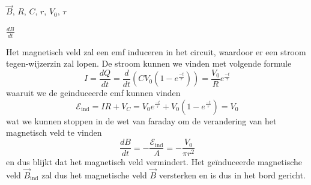     \begin{description}[labelwidth=1.5cm, leftmargin=!]
        \item[Geg. :] $\vec{B}$, $R$, $C$, $r$, $V_0$, $\tau$
        \item[Gevr. :] $\frac{dB}{dt}$
        \item[Opl. :]
            Het magnetisch veld zal een emf induceren in het circuit, waardoor er een stroom tegen-wijzerzin zal lopen. De stroom kunnen we vinden met volgende formule 
            \begin{equation*}
                I = \frac{dQ}{dt} = \frac{d}{dt} \left(CV_0(1-e^{\frac{-t}{\tau}})\right) = \frac{V_0}{R}e^{\frac{-t}{\tau}}
            \end{equation*}
            waaruit we de geinduceerde emf kunnen vinden
            \begin{equation*}
                \mathcal{E}_{\text{ind}} = IR + V_C = V_0e^{\frac{-t}{\tau}} + V_0\left( 1 - e^{\frac{-t}{\tau}}\right) = V_0
            \end{equation*}
            wat we kunnen stoppen in de wet van faraday om de verandering van het magnetisch veld te vinden
            \begin{equation*}
                \frac{dB}{dt} = - \frac{\mathcal{E}_{\text{ind}}}{A} = - \frac{V_0}{\pi r^2}
            \end{equation*}
            en dus blijkt dat het magnetisch veld vermindert. Het geïnduceerde magnetische veld $\vec{B}_{\text{ind}}$ zal dus het magnetische veld $\vec{B}$ versterken en is dus in het bord gericht.

    \end{description}


\vspace{1cm}